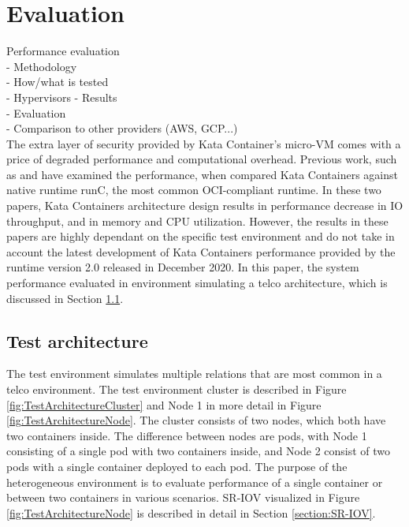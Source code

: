 \chapter{Evaluation}
\label{chapter:evaluation}

Performance evaluation \\
- Methodology \\
- How/what is tested \\
    - Hypervisors
- Results \\
- Evaluation \\
- Comparison to other providers (AWS, GCP...) \\






The extra layer of security provided by Kata Container's micro-VM comes with a price of degraded performance and computational overhead. Previous work, such as \cite{Kumar2020} and \cite{EverartsdeVelp2020} have examined the performance, when compared Kata Containers against native runtime runC, the most common OCI-compliant runtime. In these two papers, Kata Containers architecture design results in performance decrease in IO throughput, and in memory and CPU utilization. However, the results in these papers are highly dependant on the specific test environment and do not take in account the latest development of Kata Containers performance provided by the runtime version 2.0 released in December 2020. In this paper, the system performance evaluated in environment simulating a telco architecture, which is discussed in Section \ref{section:test_architecture}.

\section{Test architecture}
\label{section:test_architecture}

The test environment simulates multiple relations that are most common in a telco environment. The test environment cluster is described in Figure \ref{fig:TestArchitectureCluster} and Node 1 in more detail in Figure \ref{fig:TestArchitectureNode}. The cluster consists of two nodes, which both have two containers inside. The difference between nodes are pods, with Node 1 consisting of a single pod with two containers inside, and Node 2 consist of two pods with a single container deployed to each pod. The purpose of the heterogeneous environment is to evaluate performance of a single container or between two containers in various scenarios. SR-IOV visualized in Figure \ref{fig:TestArchitectureNode} is described in detail in Section \ref{section:SR-IOV}.


